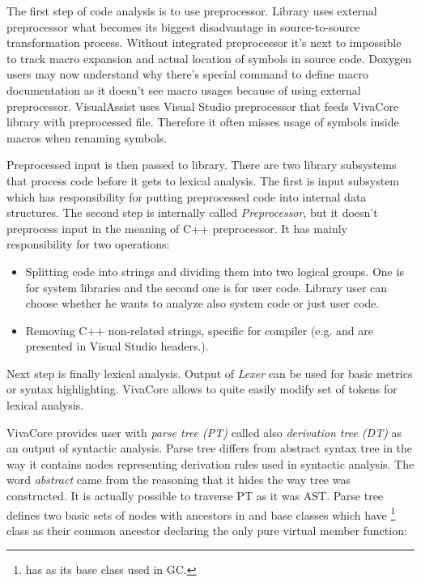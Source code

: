 The first step of code analysis is to use preprocessor. Library uses external preprocessor what becomes its biggest disadvantage in source-to-source transformation process. Without integrated preprocessor it's next to impossible to track macro expansion and actual location of symbols in source code. Doxygen users may now understand why there's special  command to define macro documentation as it doesn't see macro usages because of using external preprocessor. VisualAssist uses Visual Studio preprocessor that feeds VivaCore library with preprocessed file. Therefore it often misses usage of symbols inside macros when renaming symbols.

Preprocessed input is then passed to library. There are two library subsystems that process code before it gets to lexical analysis. The first is input subsystem which has responsibility for putting preprocessed code into internal data structures. The second step is internally called \emph{Preprocessor}, but it doesn't preprocess input in the meaning of C++ preprocessor. It has mainly responsibility for two operations:

\begin{itemize}
\item Splitting code into strings and dividing them into two logical groups. One is for system libraries and the second one is for user code. Library user can choose whether he wants to analyze also system code or just user code.
\item Removing C++ non-related strings, specific for compiler (e.g.  and  are presented in Visual Studio headers.).
\end{itemize}

Next step is finally lexical analysis. Output of \emph{Lexer} can be used for basic metrics or syntax highlighting. VivaCore allows to quite easily modify set of tokens for lexical analysis.

VivaCore provides user with \emph{parse tree (PT)} called also \emph{derivation tree (DT)} as an output of syntactic analysis. Parse tree differs from abstract syntax tree in the way it contains nodes representing derivation rules used in syntactic analysis. The word \emph{abstract} came from the reasoning that it hides the way tree was constructed. It is actually possible to traverse PT as it was AST. Parse tree defines two basic sets of nodes with ancestors in  and  base classes which have \footnote{ has  as its base class used in GC.} class as their common ancestor declaring the only pure virtual member function:

